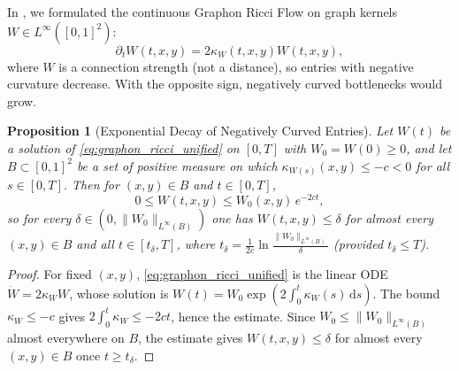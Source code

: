 \documentclass[11pt,a4paper,reqno]{amsart}
\newtheorem{proposition}[theorem]{Proposition}
\theoremstyle{definition}
\numberwithin{equation}{section}
\newcommand{\dif}{\,\mathrm{d}}
\begin{document}
In \cite{silvafilho2026flows}, we formulated the continuous Graphon Ricci Flow on graph kernels $W \in L^\infty([0, 1]^2)$:
\begin{equation}
    \label{eq:graphon_ricci_unified}
    \partial_t W(t, x, y) = 2 \kappa_W(t, x, y) W(t, x, y),
\end{equation}
where $W$ is a connection strength (not a distance), so entries with negative curvature decrease. With the opposite sign, negatively curved bottlenecks would grow.

\begin{proposition}[Exponential Decay of Negatively Curved Entries]
\label{thm:neckpinch_condensation}
Let $W(t)$ be a solution of \eqref{eq:graphon_ricci_unified} on $[0,T]$ with $W_0 = W(0) \ge 0$, and let $B \subset [0,1]^2$ be a set of positive measure on which $\kappa_{W(s)}(x,y) \le -c < 0$ for all $s \in [0,T]$. Then for $(x,y) \in B$ and $t \in [0,T]$,
\begin{equation}
    0 \le W(t,x,y) \le W_0(x,y)\, e^{-2ct},
\end{equation}
so for every $\delta \in (0, \|W_0\|_{L^\infty(B)})$ one has $W(t,x,y) \le \delta$ for almost every $(x,y) \in B$ and all $t \in [t_\delta, T]$, where $t_\delta = \frac{1}{2c}\ln\frac{\|W_0\|_{L^\infty(B)}}{\delta}$ (provided $t_\delta \le T$).
\end{proposition}
\begin{proof}
For fixed $(x,y)$, \eqref{eq:graphon_ricci_unified} is the linear ODE $\dot W = 2\kappa_W W$, whose solution is $W(t) = W_0 \exp(2\int_0^t \kappa_W(s) \dif s)$. The bound $\kappa_W \le -c$ gives $2\int_0^t \kappa_W \le -2ct$, hence the estimate. Since $W_0 \le \|W_0\|_{L^\infty(B)}$ almost everywhere on $B$, the estimate gives $W(t,x,y) \le \delta$ for almost every $(x,y) \in B$ once $t \ge t_\delta$.
\end{proof}
\end{document}
